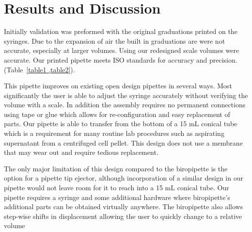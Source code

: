 \documentclass[10pt,letterpaper]{article}
\begin{document}

\section*{Results and Discussion}

Initially validation was preformed with the original graduations printed on the syringes.
Due to the expansion of air the built in graduations are were not accurate, especially at larger volumes.
Using our redesigned scale volumes were accurate.
Our printed pipette meets ISO standards for accuracy and precision. (Table~\ref{table1 ,table2}).

This pipette improves on existing open design pipettes in several ways. 
Most significantly the user is able to adjust the syringe accurately without verifying the volume with a scale.
In addition the assembly requires no permanent connections using tape or glue which allows for re-configuration and easy replacement of parts.
Our pipette is able to transfer from the bottom of a 15 mL conical tube which is a requirement for many routine lab procedures such as aspirating supernatant from a centrifuged cell pellet.
This design does not use a membrane that may wear out and require tedious replacement.

The only major limitation of this design compared to the biropipette is the option for a pipette tip ejector, although incorporation of a similar design in our pipette would not leave room for it to reach into a 15 mL conical tube. 
Our pipette requires a syringe and some additional hardware where biropipette's additional parts can be obtained virtually anywhere.
The biropipette also allows step-wise shifts in displacement allowing the user to quickly change to a relative volume
\end{document}
